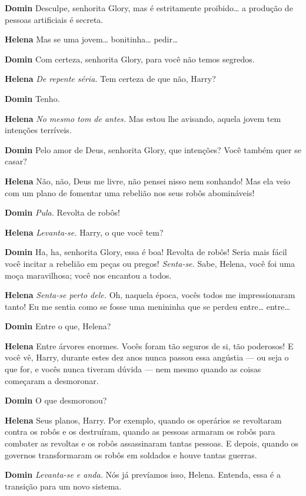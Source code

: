 \textbf{Domin} Desculpe, senhorita Glory, mas é estritamente proibido\ldots{} a produção
de pessoas artificiais é secreta.

\textbf{Helena} Mas se uma jovem\ldots{} bonitinha\ldots{} pedir\ldots{}

\textbf{Domin} Com certeza, senhorita Glory, para você não temos segredos.

\textbf{Helena} \emph{De repente séria.} Tem certeza de que não, Harry?

\textbf{Domin} Tenho.

\textbf{Helena} \emph{No mesmo tom de antes.} Mas estou lhe avisando, aquela jovem
tem intenções terríveis.

\textbf{Domin} Pelo amor de Deus, senhorita Glory, que intenções? Você também quer se casar?

\textbf{Helena} Não, não, Deus me livre, não pensei nisso nem sonhando! Mas ela veio com
um plano de fomentar uma rebelião nos seus robôs abomináveis!

\textbf{Domin} \emph{Pula.} Revolta de robôs!

\textbf{Helena} \emph{Levanta-se.} Harry, o que você tem?

\textbf{Domin} Ha, ha, senhorita Glory, essa é boa! Revolta de robôs! Seria mais fácil
você incitar a rebelião em peças ou pregos! \emph{Senta-se.} Sabe, Helena, você foi uma
moça maravilhosa; você nos encantou a todos.

\textbf{Helena} \emph{Senta-se perto dele.} Oh, naquela época, vocês todos me
impressionaram tanto! Eu me sentia como se fosse uma menininha que se perdeu
entre\ldots{} entre\ldots{}

\textbf{Domin} Entre o que, Helena?

\textbf{Helena} Entre árvores enormes. Vocês foram tão seguros de si, tão poderosos! E
você vê, Harry, durante estes dez anos nunca passou essa angústia --- ou seja o
que for, e vocês nunca tiveram dúvida --- nem mesmo quando as coisas começaram a
desmoronar.

\textbf{Domin} O que desmoronou?

\textbf{Helena} Seus planos, Harry. Por exemplo, quando os operários se revoltaram
contra os robôs e os destruíram, quando as pessoas armaram os robôs para
combater as revoltas e os robôs assassinaram tantas pessoas. E depois, quando  os
governos transformaram os robôs em soldados e houve tantas guerras.

\textbf{Domin} \emph{Levanta-se e anda.} Nós já prevíamos isso, Helena. Entenda,
essa é a transição para um novo sistema.

